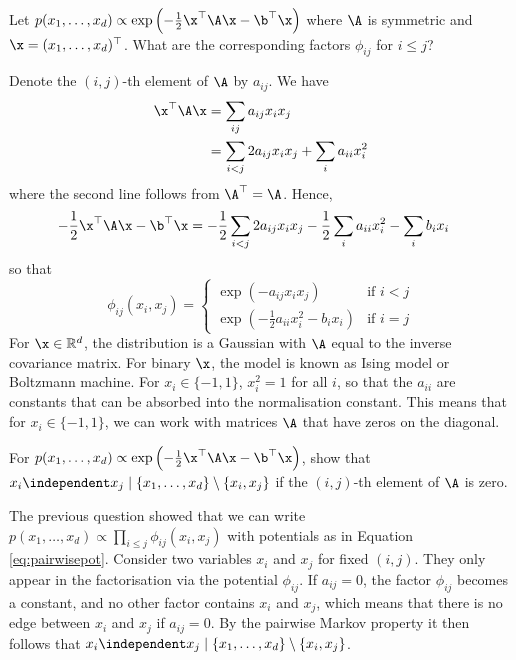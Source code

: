 \begin{exenumerate}

\item Let $p(x_1, \ldots, x_d) \propto \exp\left( -\frac{1}{2} \x^\top
  \A \x - \b^\top \x \right)$ where $\A$ is symmetric and $\x = (x_1,
  \ldots, x_d)^\top$. What are the corresponding factors $\phi_{ij}$
  for $i\le j$?
  \begin{solution}
    Denote the $(i,j)$-th element of $\A$ by $a_{ij}$. We have
    \begin{align}
      \x^\top \A \x & = \sum_{ij} a_{ij} x_i x_j \\
      &= \sum_{i<j} 2 a_{ij} x_i x_j + \sum_i a_{ii} x_i^2
    \end{align}
    where the second line follows from $\A^\top =\A$. Hence,
    \begin{align}
      -\frac{1}{2} \x^\top \A \x - \b^\top \x & = -\frac{1}{2} \sum_{i<j} 2a_{ij} x_i x_j - \frac{1}{2} \sum_i a_{ii} x_i^2 - \sum_i b_i x_i
    \end{align}
    so that
\begin{equation}
      \phi_{ij}(x_i,x_j) = \begin{cases}
        \exp\left(- a_{ij} x_i x_j\right) & \text{if } i < j\\
        \exp\left( - \frac{1}{2} a_{ii} x_i^2 - b_i x_i\right) & \text{if } i=j
      \end{cases}
      \label{eq:pairwisepot}
\end{equation}
For $\x \in \mathbb{R}^d$, the distribution is a Gaussian with $\A$
equal to the inverse covariance matrix. For binary $\x$, the model is
known as Ising model or Boltzmann machine. For $x_i \in \{-1,1\}$,
$x_i^2=1$ for all $i$, so that the $a_{ii}$ are constants
that can be absorbed into the normalisation constant. This means that
for $x_i \in \{-1,1\}$, we can work with matrices $\A$ that have zeros
on the diagonal.

  \end{solution}

\item For $p(x_1, \ldots, x_d) \propto \exp\left( -\frac{1}{2} \x^\top
  \A \x - \b^\top \x \right)$, show that $x_i \independent x_j \mid
  \{x_1, \ldots, x_d\} \setminus \{x_i,x_j\}$ if the $(i,j)$-th
  element of $\A$ is zero.

  \begin{solution}

    The previous question showed that we can write $p(x_1, \ldots,
    x_d) \propto \prod_{i \leq j} \phi_{ij}(x_i,x_j)$ with potentials as in
    Equation \eqref{eq:pairwisepot}.  Consider two variables $x_i$ and
    $x_j$ for fixed $(i,j)$. They only appear in the factorisation via
    the potential $\phi_{ij}$. If $a_{ij} = 0$, the factor $\phi_{ij}$
    becomes a constant, and no other factor contains $x_i$ and $x_j$,
    which means that there is no edge between $x_i$ and $x_j$ if
    $a_{ij}=0$. By the pairwise Markov property it then follows that
    $x_i \independent x_j \mid \{x_1, \ldots, x_d\} \setminus \{x_i,x_j\}$.

  \end{solution}

\end{exenumerate}


